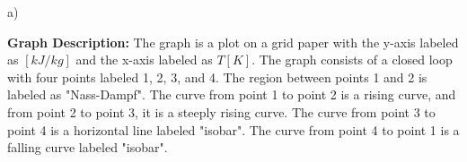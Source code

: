 a)

\textbf{Graph Description:} The graph is a plot on a grid paper with the y-axis labeled as $[kJ/kg]$ and the x-axis labeled as $T[K]$. The graph consists of a closed loop with four points labeled 1, 2, 3, and 4. The region between points 1 and 2 is labeled as "Nass-Dampf". The curve from point 1 to point 2 is a rising curve, and from point 2 to point 3, it is a steeply rising curve. The curve from point 3 to point 4 is a horizontal line labeled "isobar". The curve from point 4 to point 1 is a falling curve labeled "isobar".